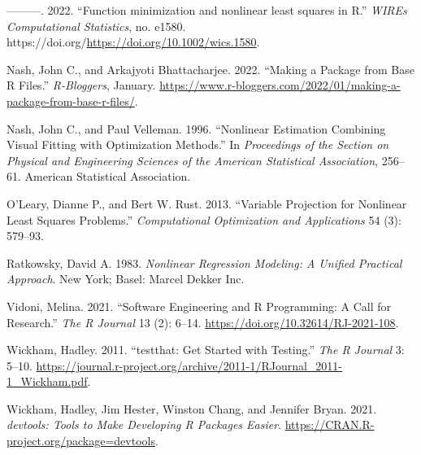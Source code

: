 \begin{CSLReferences}{1}{0}
\leavevmode{}%
---------. 2022. {``{Function minimization and nonlinear least squares in R}.''} \emph{WIREs Computational Statistics}, no. e1580. https://doi.org/\url{https://doi.org/10.1002/wics.1580}.

\leavevmode{}%
Nash, John C., and Arkajyoti Bhattacharjee. 2022. {``Making a Package from Base {R} Files.''} \emph{R-Bloggers}, January. \url{https://www.r-bloggers.com/2022/01/making-a-package-from-base-r-files/}.

\leavevmode{}%
Nash, John C., and Paul Velleman. 1996. {``Nonlinear Estimation Combining Visual Fitting with Optimization Methods.''} In \emph{Proceedings of the Section on Physical and Engineering Sciences of the American Statistical Association}, 256--61. American Statistical Association.

\leavevmode{}%
O'Leary, Dianne P., and Bert W. Rust. 2013. {``Variable Projection for Nonlinear Least Squares Problems.''} \emph{Computational Optimization and Applications} 54 (3): 579--93.

\leavevmode{}%
Ratkowsky, David A. 1983. \emph{Nonlinear Regression Modeling: A Unified Practical Approach}. New York; Basel: Marcel Dekker Inc.

\leavevmode{}%
Vidoni, Melina. 2021. {``{Software Engineering and R Programming: A Call for Research}.''} \emph{{The R Journal}} 13 (2): 6--14. \url{https://doi.org/10.32614/RJ-2021-108}.

\leavevmode{}%
Wickham, Hadley. 2011. {``{testthat: Get Started with Testing}.''} \emph{The R Journal} 3: 5--10. \url{https://journal.r-project.org/archive/2011-1/RJournal_2011-1_Wickham.pdf}.

\leavevmode{}%
Wickham, Hadley, Jim Hester, Winston Chang, and Jennifer Bryan. 2021. \emph{{devtools: Tools to Make Developing R Packages Easier}}. \url{https://CRAN.R-project.org/package=devtools}.

\end{CSLReferences}



\address{%
John C. Nash\\
retired professor, University of Ottawa\\%
Telfer School of Management\\ Ottawa ON Canada K1N 6N5\\
%
%
\textit{ORCiD: \href{https://orcid.org/0000-0002-2762-8039}{0000-0002-2762-8039}}\\%
\href{mailto:profjcnash@gmail.com}{\nolinkurl{profjcnash@gmail.com}}%
}

\address{%
Arkajyoti Bhattacharjee\\
Indian Institute of Technology\\%
Department of Mathematics and Statistics\\ Kanpur\\
%
%
%
\href{mailto:arkastat98@gmail.com}{\nolinkurl{arkastat98@gmail.com}}%
}
